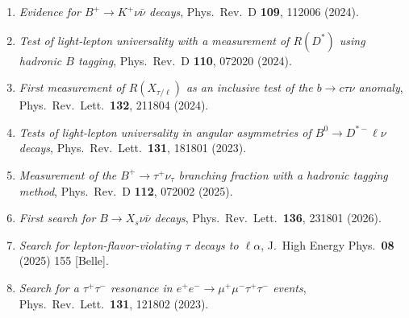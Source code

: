 \documentclass[a4paper,11pt,fontset=none]{ctexart}
\begin{document}
{\smallskip
\noindent{}
\begin{enumerate}\setlength{\itemsep}{1.5pt}
  \item \textit{Evidence for $B^{+}\!\to K^{+}\nu\bar\nu$ decays}, Phys.\ Rev.\ D \textbf{109}, 112006 (2024)\;[Belle\,II].
  \item \textit{Test of light-lepton universality with a measurement of $R(D^{*})$ using hadronic $B$ tagging}, Phys.\ Rev.\ D \textbf{110}, 072020 (2024)\;[Belle\,II].
  \item \textit{First measurement of $R(X_{\tau/\ell})$ as an inclusive test of the $b\!\to c\tau\nu$ anomaly}, Phys.\ Rev.\ Lett.\ \textbf{132}, 211804 (2024)\;[Belle\,II].
  \item \textit{Tests of light-lepton universality in angular asymmetries of $B^{0}\!\to D^{*-}\ell\nu$ decays}, Phys.\ Rev.\ Lett.\ \textbf{131}, 181801 (2023)\;[Belle\,II].
  \item \textit{Measurement of the $B^{+}\!\to\tau^{+}\nu_{\tau}$ branching fraction with a hadronic tagging method}, Phys.\ Rev.\ D \textbf{112}, 072002 (2025)\;[Belle\,II].
  \item \textit{First search for $B\!\to X_{s}\nu\bar\nu$ decays}, Phys.\ Rev.\ Lett.\ \textbf{136}, 231801 (2026)\;[Belle\,II].
  \item \textit{Search for lepton-flavor-violating $\tau$ decays to $\ell\alpha$}, J.\ High Energy Phys.\ \textbf{08} (2025) 155 [Belle].
  \item \textit{Search for a $\tau^{+}\tau^{-}$ resonance in $e^{+}e^{-}\!\to\mu^{+}\mu^{-}\tau^{+}\tau^{-}$ events}, Phys.\ Rev.\ Lett.\ \textbf{131}, 121802 (2023)\;[Belle\,II].
\end{enumerate}

}
\end{document}
